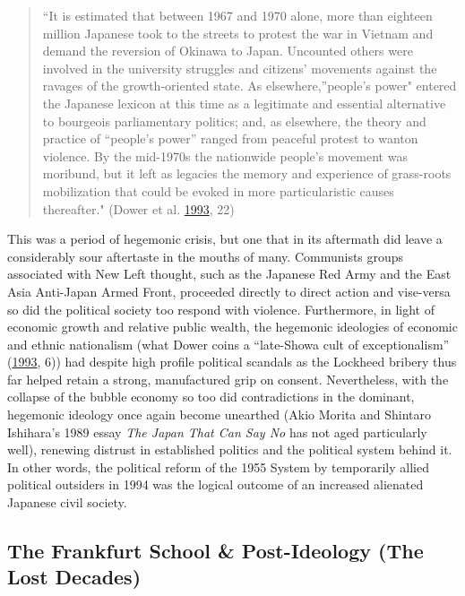\documentclass[10pt,british,A4paper,,openany]{memoir}
\begin{document}
\begin{quote}
``It is estimated that between 1967 and 1970 alone, more than eighteen
million Japanese took to the streets to protest the war in Vietnam and
demand the reversion of Okinawa to Japan. Uncounted others were involved
in the university struggles and citizens' movements against the ravages
of the growth-oriented state. As elsewhere,''people's power" entered the
Japanese lexicon at this time as a legitimate and essential alternative
to bourgeois parliamentary politics; and, as elsewhere, the theory and
practice of ``people's power'' ranged from peaceful protest to wanton
violence. By the mid-1970s the nationwide people's movement was
moribund, but it left as legacies the memory and experience of
grass-roots mobilization that could be evoked in more particularistic
causes thereafter." (Dower et al.
\protect\hyperlink{ref-dower_peace_1993}{1993}, 22)
\end{quote}

This was a period of hegemonic crisis, but one that in its aftermath did
leave a considerably sour aftertaste in the mouths of many. Communists
groups associated with New Left thought, such as the Japanese Red Army
and the East Asia Anti-Japan Armed Front, proceeded directly to direct
action and vise-versa so did the political society too respond with
violence. Furthermore, in light of economic growth and relative public
wealth, the hegemonic ideologies of economic and ethnic nationalism
(what Dower coins a ``late-Showa cult of exceptionalism''
(\protect\hyperlink{ref-dower_peace_1993}{1993}, 6)) had despite high
profile political scandals as the Lockheed bribery thus far helped
retain a strong, manufactured grip on consent. Nevertheless, with the
collapse of the bubble economy so too did contradictions in the
dominant, hegemonic ideology once again become unearthed (Akio Morita
and Shintaro Ishihara's 1989 essay \emph{The Japan That Can Say No} has
not aged particularly well), renewing distrust in established politics
and the political system behind it. In other words, the political reform
of the 1955 System by temporarily allied political outsiders in 1994 was
the logical outcome of an increased alienated Japanese civil society.

\subsection{The Frankfurt School \& Post-Ideology (The Lost
Decades)}\label{the-frankfurt-school-post-ideology-the-lost-decades}
\end{document}
